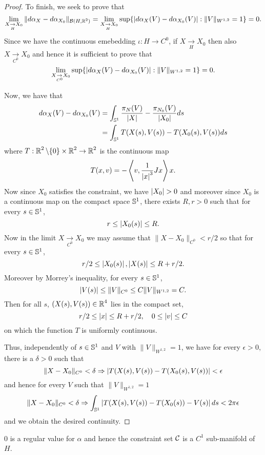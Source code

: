\documentclass[12pt]{article}
\begin{document}
\begin{proof}
To finish, we seek to prove that
\[
\lim_{X \underset{H}{\to} X_0} \|d\alpha_X - d\alpha_{X_0}\|_{\mathcal{B}(H, \operatorname{\mathbb{R}}^2)} = \lim_{X \underset{H}{\to} X_0} \sup \{\left|{d\alpha_X (V) - d\alpha_{X_0}(V)}\right| : \|V\|_{W^{1,2}} = 1\} = 0.
\]
Since we have the continuous emebedding \(\iota : H \to C^0\), if \(X \underset{H}{\to} X_0\) then also \(X \underset{C^0}{\to} X_0\) and hence it is sufficient to prove that
\[
\lim_{X \underset{C^0}{\to} X_0} \sup \{\left|{d\alpha_X (V) - d\alpha_{X_0}(V)}\right| : \|V\|_{W^{1,2}} = 1\} = 0.
\]

Now, we have that
\[
\begin{split}
d\alpha_X(V) - d\alpha_{X_0} (V) &= \int_{\operatorname{\mathbb{S}^1}} \frac{\pi_N(V)}{\left|{X}\right|} - \frac{\pi_{N_0} (V)}{\left|{X_0}\right|} ds \\
&= \int_{\operatorname{\mathbb{S}^1}} T(X(s), V(s)) - T(X_0(s), V(s)) ds
\end{split}
\]
where \(T : \operatorname{\mathbb{R}}^2\backslash\{0\} \times \operatorname{\mathbb{R}}^2 \to \operatorname{\mathbb{R}}^2\) is the continuous map
\[
T (x, v) = -\left\langle{v},{\frac{1}{\left|{x}\right|^3}J x}\right\rangle x.
\]
Now since \(X_0\) satisfies the constraint, we have \(\left|{X_0}\right| > 0\) and moreover since \(X_0\) is a continuous map on the compact space \(\operatorname{\mathbb{S}^1}\), there exists \(R, r > 0\) such that for every \(s \in \operatorname{\mathbb{S}^1}\),
\[
r \leq \left|{X_0(s)}\right| \leq R.
\]
Now in the limit \(X \underset{C^0}{\to} X_0\) we may assume that \(\|X - X_0\|_{C^0} < r/2\) so that for every \(s \in \operatorname{\mathbb{S}^1}\),
\[
r/2 \leq \left|{X_0(s)}\right|, \left|{X(s)}\right| \leq R + r/2.
\]
Moreover by Morrey's inequality, for every \(s \in \operatorname{\mathbb{S}^1}\),
\[
\left|{V(s)}\right| \leq \|V\|_{C^0} \leq C \|V\|_{W^{1,2}} = C.
\]
Then for all \(s\), \((X(s), V(s)) \in \operatorname{\mathbb{R}}^4\) lies in the compact set,
\[
r/2 \leq \left|{x}\right| \leq R + r/2, \quad 0 \leq \left|{v}\right| \leq C
\]
on which the function \(T\) is uniformly continuous.

Thus, independently of \(s \in \operatorname{\mathbb{S}^1}\) and \(V\) with \(\|V\|_{W^{1,2}} = 1\), we have for every \(\epsilon > 0\), there is a \(\delta > 0\) such that
\[
\|X - X_0\|_{C^0} < \delta \Rightarrow \left|{T(X(s), V(s)) - T(X_0(s), V(s))}\right| < \epsilon
\]
and hence for every \(V\) such that \(\|V\|_{W^{1,2}} = 1\)
\[
\|X - X_0\|_{C^0} < \delta \Rightarrow \int_{\operatorname{\mathbb{S}^1}} \left|{T(X(s), V(s)) - T(X_0(s)) - V(s)}\right| ds < 2\pi \epsilon
\]
and we obtain the desired continuity.
\end{proof}

\begin{lem}
\label{lem:constraintC1}
\(0\) is a regular value for \(\alpha\) and hence the constraint set \(\operatorname{\mathcal{C}}\) is a \(C^1\) sub-manifold of \(H\).
\end{lem}
\end{document}
